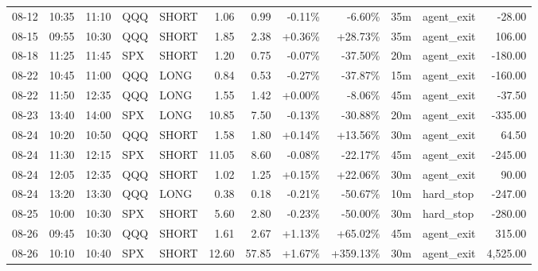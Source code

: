 \documentclass[11pt,a4paper,twoside]{article}
\begin{document}
\begin{center}
\begin{longtable}{>{\color{txtmain}}l l l l l r r r r r >{\color{txtmain}}l r}
08-12 & 10:35 & 11:10 & QQQ & SHORT & 1.06 & 0.99 & \textcolor{lossred}{-0.11\%} & \textcolor{lossred}{-6.60\%} & 35m & agent\_exit & \textcolor{lossred}{-28.00} \\
08-15 & 09:55 & 10:30 & QQQ & SHORT & 1.85 & 2.38 & \textcolor{wingreen}{+0.36\%} & \textcolor{wingreen}{+28.73\%} & 35m & agent\_exit & \textcolor{wingreen}{106.00} \\
08-18 & 11:25 & 11:45 & SPX & SHORT & 1.20 & 0.75 & \textcolor{lossred}{-0.07\%} & \textcolor{lossred}{-37.50\%} & 20m & agent\_exit & \textcolor{lossred}{-180.00} \\
08-22 & 10:45 & 11:00 & QQQ & LONG & 0.84 & 0.53 & \textcolor{lossred}{-0.27\%} & \textcolor{lossred}{-37.87\%} & 15m & agent\_exit & \textcolor{lossred}{-160.00} \\
08-22 & 11:50 & 12:35 & QQQ & LONG & 1.55 & 1.42 & \textcolor{wingreen}{+0.00\%} & \textcolor{lossred}{-8.06\%} & 45m & agent\_exit & \textcolor{lossred}{-37.50} \\
08-23 & 13:40 & 14:00 & SPX & LONG & 10.85 & 7.50 & \textcolor{lossred}{-0.13\%} & \textcolor{lossred}{-30.88\%} & 20m & agent\_exit & \textcolor{lossred}{-335.00} \\
08-24 & 10:20 & 10:50 & QQQ & SHORT & 1.58 & 1.80 & \textcolor{wingreen}{+0.14\%} & \textcolor{wingreen}{+13.56\%} & 30m & agent\_exit & \textcolor{wingreen}{64.50} \\
08-24 & 11:30 & 12:15 & SPX & SHORT & 11.05 & 8.60 & \textcolor{lossred}{-0.08\%} & \textcolor{lossred}{-22.17\%} & 45m & agent\_exit & \textcolor{lossred}{-245.00} \\
08-24 & 12:05 & 12:35 & QQQ & SHORT & 1.02 & 1.25 & \textcolor{wingreen}{+0.15\%} & \textcolor{wingreen}{+22.06\%} & 30m & agent\_exit & \textcolor{wingreen}{90.00} \\
08-24 & 13:20 & 13:30 & QQQ & LONG & 0.38 & 0.18 & \textcolor{lossred}{-0.21\%} & \textcolor{lossred}{-50.67\%} & 10m & hard\_stop & \textcolor{lossred}{-247.00} \\
08-25 & 10:00 & 10:30 & SPX & SHORT & 5.60 & 2.80 & \textcolor{lossred}{-0.23\%} & \textcolor{lossred}{-50.00\%} & 30m & hard\_stop & \textcolor{lossred}{-280.00} \\
08-26 & 09:45 & 10:30 & QQQ & SHORT & 1.61 & 2.67 & \textcolor{wingreen}{+1.13\%} & \textcolor{wingreen}{+65.02\%} & 45m & agent\_exit & \textcolor{wingreen}{315.00} \\
08-26 & 10:10 & 10:40 & SPX & SHORT & 12.60 & 57.85 & \textcolor{wingreen}{+1.67\%} & \textcolor{wingreen}{+359.13\%} & 30m & agent\_exit & \textcolor{wingreen}{4,525.00} \\

\end{longtable}
\end{center}
\end{document}
